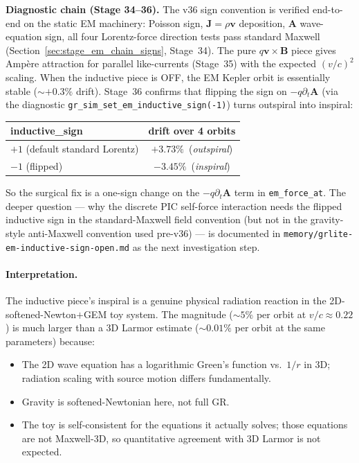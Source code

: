 \documentclass[11pt,a4paper]{article}
\newcommand{\vv}[1]{\mathbf{#1}}
\begin{document}
\textbf{Diagnostic chain (Stage 34--36).}  The v36 sign convention
is verified end-to-end on the static EM machinery: Poisson sign,
$\vv{J}=\rho\vv{v}$ deposition, $\vv{A}$ wave-equation sign, all
four Lorentz-force direction tests pass standard Maxwell
(Section~\ref{sec:stage_em_chain_signs}, Stage~34).  The pure
$q\vv{v}\times\vv{B}$ piece gives Amp\`ere attraction for parallel
like-currents (Stage~35) with the expected $(v/c)^2$ scaling.  When
the inductive piece is OFF, the EM Kepler orbit is essentially
stable ($\sim +0.3\%$ drift).  Stage~36 confirms that flipping the
sign on $-q\partial_t\vv{A}$ (via the diagnostic
\texttt{gr\_sim\_set\_em\_inductive\_sign(-1)}) turns outspiral
into inspiral:

\begin{center}
\begin{tabular}{@{}lc@{}}
\toprule
inductive\_sign & drift over 4 orbits \\
\midrule
$+1$ (default standard Lorentz)  & $+3.73\%$ \,(\emph{outspiral}) \\
$-1$ (flipped)                    & $-3.45\%$ \,(\emph{inspiral})  \\
\bottomrule
\end{tabular}
\end{center}

So the surgical fix is a one-sign change on the
$-q\partial_t\vv{A}$ term in \texttt{em\_force\_at}.  The deeper
question --- why the discrete PIC self-force interaction needs the
flipped inductive sign in the standard-Maxwell field convention
(but not in the gravity-style anti-Maxwell convention used pre-v36)
--- is documented in \texttt{memory/grlite-em-inductive-sign-open.md}
as the next investigation step.

\paragraph{Interpretation.}  The inductive piece's inspiral is a
genuine physical radiation reaction in the 2D-softened-Newton$+$GEM
toy system.  The magnitude ($\sim 5\%$ per orbit at $v/c \approx 0.22$)
is much larger than a 3D Larmor estimate ($\sim 0.01\%$ per orbit at
the same parameters) because:
\begin{itemize}
  \item The 2D wave equation has a logarithmic Green's function vs.\
    $1/r$ in 3D; radiation scaling with source motion differs
    fundamentally.
  \item Gravity is softened-Newtonian here, not full GR.
  \item The toy is self-consistent for the equations it actually solves;
    those equations are not Maxwell-3D, so quantitative agreement with
    3D Larmor is not expected.
\end{itemize}
\end{document}
